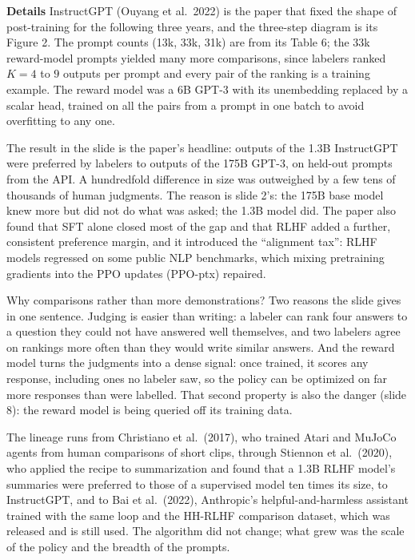 \documentclass[11pt,letterpaper]{article}
\newcommand{\para}[1]{\medskip\noindent\textbf{#1}\quad}
\begin{document}
\para{Details} InstructGPT (Ouyang et al.\ 2022) is the paper that fixed the shape of post-training for the following three years, and the three-step diagram is its Figure 2. The prompt counts (13k, 33k, 31k) are from its Table 6; the 33k reward-model prompts yielded many more comparisons, since labelers ranked $K=4$ to $9$ outputs per prompt and every pair of the ranking is a training example. The reward model was a 6B GPT-3 with its unembedding replaced by a scalar head, trained on all the pairs from a prompt in one batch to avoid overfitting to any one.

The result in the slide is the paper's headline: outputs of the 1.3B InstructGPT were preferred by labelers to outputs of the 175B GPT-3, on held-out prompts from the API. A hundredfold difference in size was outweighed by a few tens of thousands of human judgments. The reason is slide 2's: the 175B base model knew more but did not do what was asked; the 1.3B model did. The paper also found that SFT alone closed most of the gap and that RLHF added a further, consistent preference margin, and it introduced the ``alignment tax'': RLHF models regressed on some public NLP benchmarks, which mixing pretraining gradients into the PPO updates (PPO-ptx) repaired.

Why comparisons rather than more demonstrations? Two reasons the slide gives in one sentence. Judging is easier than writing: a labeler can rank four answers to a question they could not have answered well themselves, and two labelers agree on rankings more often than they would write similar answers. And the reward model turns the judgments into a dense signal: once trained, it scores any response, including ones no labeler saw, so the policy can be optimized on far more responses than were labelled. That second property is also the danger (slide 8): the reward model is being queried off its training data.

The lineage runs from Christiano et al.\ (2017), who trained Atari and MuJoCo agents from human comparisons of short clips, through Stiennon et al.\ (2020), who applied the recipe to summarization and found that a 1.3B RLHF model's summaries were preferred to those of a supervised model ten times its size, to InstructGPT, and to Bai et al.\ (2022), Anthropic's helpful-and-harmless assistant trained with the same loop and the HH-RLHF comparison dataset, which was released and is still used. The algorithm did not change; what grew was the scale of the policy and the breadth of the prompts.
\end{document}

